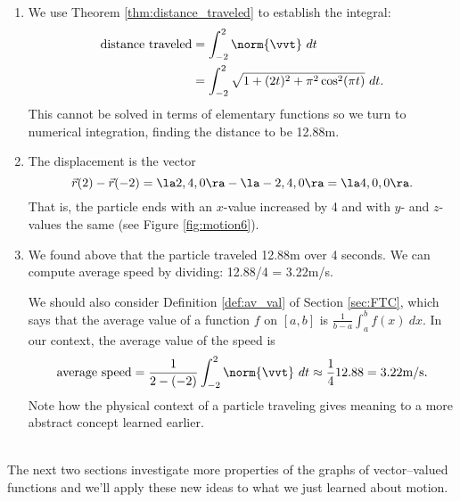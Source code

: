 \enlargethispage{2\baselineskip}
{\begin{enumerate}
	\item We use Theorem \ref{thm:distance_traveled} to establish the integral:
	\begin{align*}
	\text{distance traveled} &= \int_{-2}^2 \norm{\vvt}\ dt \\
							&= \int_{-2}^2 \sqrt{1+(2t)^2+ \pi^2\cos^2(\pi t)}\ dt.
	\end{align*}
	This cannot be solved in terms of elementary functions so we turn to numerical integration, finding the distance to be 12.88m.
	
	\item		The displacement is the vector $$\vec r(2)-\vec r(-2) = \la 2,4,0\ra - \la -2,4,0\ra = \la 4,0,0\ra.$$ That is, the particle ends with an $x$-value increased by 4 and with $y$- and $z$-values the same (see Figure \ref{fig:motion6}).
	
	\item		We found above that the particle traveled 12.88m over 4 seconds. We can compute average speed by dividing: 12.88/4 = 3.22m/s. 
	
	We should also consider Definition \ref{def:av_val} of Section \ref{sec:FTC}, which says that the average value of a function $f$ on $[a,b]$ is $\frac{1}{b-a}\int_a^b f(x)\ dx$. In our context, the average value of the speed is
	$$\text{average speed} = \frac{1}{2-(-2)}\int_{-2}^2 \norm{\vvt}\ dt \approx \frac14 12.88 = 3.22\text{m/s}.$$
	Note how the physical context of a particle traveling gives meaning to a more abstract concept learned earlier.
\end{enumerate}
\baselineskip
}\\

The next two sections investigate more properties of the graphs of vector--valued functions and we'll apply these new ideas to what we just learned about motion.


